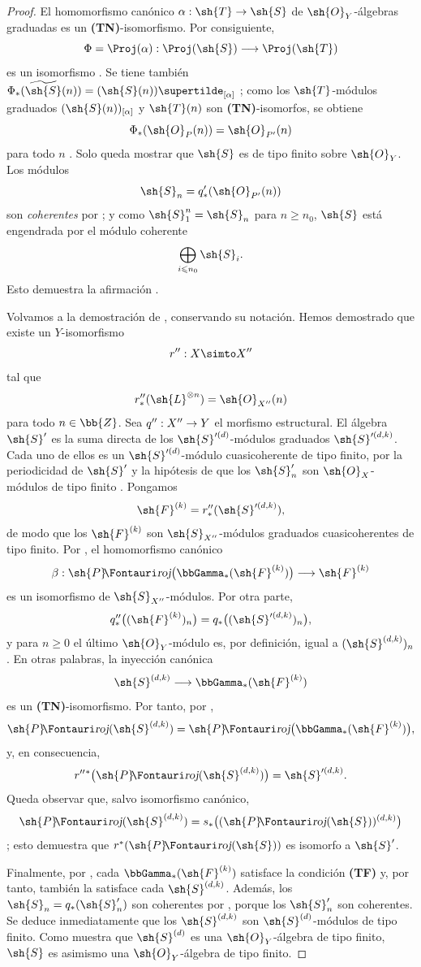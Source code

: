 \documentclass[oneside]{amsart}
\makeatletter
\renewcommand{\leq}{\leqslant}
\renewcommand{\geq}{\geqslant}
\newcommand{\ega@arrow}[2]{\mathchoice{#1}{#2}{#2}{#2}}
\renewcommand{\to}{\ega@arrow{\longrightarrow}{\rightarrow}}
\newcommand*{\ega@sheafop}[3]{\sh{#1}#2\textup{\kern-2.2pt{\Fontauri\slshape #3}}}
\newcommand*{\shProj}{\ega@sheafop{P}{}{roj}}
\let\EGAOriginalLabel\label
\renewcommand{\label}[1]{\phantomsection\EGAOriginalLabel{#1}}
\makeatother
\begin{document}
\begin{proof}
El homomorfismo canónico $\alpha:\sh{T}\to\sh{S}$ de $\sh{O}_Y$-álgebras graduadas es un \textbf{(TN)}-isomorfismo.
Por consiguiente,
\label{III.2.3.5.1}
\[
  \Phi=\Proj(\alpha):\Proj(\sh{S})\longrightarrow\Proj(\sh{T})
\]
es un isomorfismo .
Se tiene también $\Phi_*(\widetilde{\sh{S}}(n))=(\sh{S}(n))\supertilde_{[\alpha]}$ ; como los $\sh{T}$-módulos graduados $(\sh{S}(n))_{[\alpha]}$ y $\sh{T}(n)$ son \textbf{(TN)}-isomorfos, se obtiene
\[
  \Phi_*(\sh{O}_P(n))=\sh{O}_{P'}(n)
\]
para todo $n$ .
Solo queda mostrar que $\sh{S}$ es de tipo finito sobre $\sh{O}_Y$.
Los módulos
\[
  \sh{S}_n=q'_*(\sh{O}_{P'}(n))
\]
son \emph{coherentes} por ; y como $\sh{S}_1^n=\sh{S}_n$ para $n\geq n_0$, $\sh{S}$ está engendrada por el módulo coherente
\[
  \bigoplus_{i\leq n_0}\sh{S}_i.
\]
Esto demuestra la afirmación .

Volvamos a la demostración de , conservando su notación.
Hemos demostrado que existe un $Y$-isomorfismo
\[
  r'':X\simto X''
\]
tal que
\[
  r''_*(\sh{L}^{\otimes n})=\sh{O}_{X''}(n)
\]
para todo $n\in\bb{Z}$.
Sea $q'':X''\to Y$ el morfismo estructural.
El álgebra $\sh{S}'$ es la suma directa de los $\sh{S}'^{(d)}$-módulos graduados $\sh{S}'^{(d,k)}$.
Cada uno de ellos es un $\sh{S}'^{(d)}$-módulo cuasicoherente de tipo finito, por la periodicidad de $\sh{S}'$ y la hipótesis de que los $\sh{S}'_n$ son $\sh{O}_X$-módulos de tipo finito .
Pongamos
\[
  \sh{F}^{(k)}=r''_*(\sh{S}'^{(d,k)}),
\]
de modo que los $\sh{F}^{(k)}$ son $\sh{S}_{X''}$-módulos graduados cuasicoherentes de tipo finito.
Por , el homomorfismo canónico
\[
  \beta:\shProj\bigl(\bbGamma_*(\sh{F}^{(k)})\bigr)
  \longrightarrow\sh{F}^{(k)}
\]
es un isomorfismo de $\sh{S}_{X''}$-módulos.
Por otra parte,
\[
  q''_*\bigl((\sh{F}^{(k)})_n\bigr)
  =q_*\bigl((\sh{S}'^{(d,k)})_n\bigr),
\]
y para $n\geq0$ el último $\sh{O}_Y$-módulo es, por definición, igual a $(\sh{S}^{(d,k)})_n$.
En otras palabras, la inyección canónica
\[
  \sh{S}^{(d,k)}
  \longrightarrow\bbGamma_*(\sh{F}^{(k)})
\]
es un \textbf{(TN)}-isomorfismo.
Por tanto, por ,
\[
  \shProj(\sh{S}^{(d,k)})
  =\shProj\bigl(\bbGamma_*(\sh{F}^{(k)})\bigr),
\]
y, en consecuencia,
\[
  r''{}^*\bigl(\shProj(\sh{S}^{(d,k)})\bigr)
  =\sh{S}'^{(d,k)}.
\]
Queda observar que, salvo isomorfismo canónico,
\[
  \shProj(\sh{S}^{(d,k)})
  =s_*\bigl((\shProj(\sh{S}))^{(d,k)}\bigr)
\]
; esto demuestra que $r^*(\shProj(\sh{S}))$ es isomorfo a $\sh{S}'$.

Finalmente, por , cada $\bbGamma_*(\sh{F}^{(k)})$ satisface la condición \textbf{(TF)} y, por tanto, también la satisface cada $\sh{S}^{(d,k)}$.
Además, los $\sh{S}_n=q_*(\sh{S}'_n)$ son coherentes por , porque los $\sh{S}'_n$ son coherentes.
Se deduce inmediatamente que los $\sh{S}^{(d,k)}$ son $\sh{S}^{(d)}$-módulos de tipo finito.
Como  muestra que $\sh{S}^{(d)}$ es una $\sh{O}_Y$-álgebra de tipo finito, $\sh{S}$ es asimismo una $\sh{O}_Y$-álgebra de tipo finito.
\end{proof}
\end{document}
